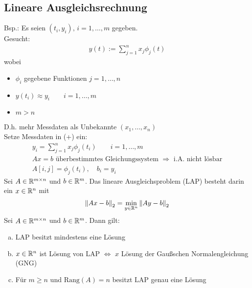 \subsection{Lineare Ausgleichsrechnung}
Bsp.: Es seien $(t_i, y_i),\,i=1,\ldots,m$ gegeben.\\
Gesucht: 
\begin{align*}
  y(t) := \sum^{n}_{j=1} x_j \phi_j(t) \tag{ + }
\end{align*}
wobei
\begin{itemize}
  \item $\phi_i$ gegebene Funktionen $j=1,\ldots,n$
  \item $y(t_i) \approx y_i \qquad i=1,\ldots,m$
  \item $m > n$
\end{itemize}
D.h. mehr Messdaten als Unbekannte $(x_1,\ldots,x_n)$\\
Setze Messdaten in (+) ein:
\begin{align*}
  y_i = \sum^{n}_{j=1} x_j \phi_j(t_i) \qquad i=1,\ldots,m\\
  Ax=b \text{ überbestimmtes Gleichungssystem } \Rightarrow \text{ i.A. nicht lösbar}\\
  A[i,j] = \phi_j(t_i), \quad b_i = y_i
\end{align*}
 Sei $A \in \mathbb{R}^{m \times n}$ und $b \in \mathbb{R}^{m}$. Das lineare Ausgleichsproblem (LAP) besteht darin ein $x \in \mathbb{R}^{n}$ mit
\begin{align*}
  \left\lVert Ax-b \right\rVert_2 = \underset{y \in \mathbb{R}^{n}}{\min} \left\lVert Ay - b \right\rVert_2
\end{align*}
\satz Sei $A \in \mathbb{R}^{m \times n}$ und $b \in \mathbb{R}^{m}$. Dann gilt:
\begin{enumerate}[a)]
  \item LAP besitzt mindestens eine Lösung
  \item $x \in \mathbb{R}^{n}$ ist Lösung von LAP $\Leftrightarrow$ $x$ Lösung der Gaußschen Normalengleichung (GNG)
  \item Für $m \geq n$ und $\mathrm{Rang}(A) = n$ besitzt LAP genau eine Lösung

\end{enumerate}
\beweis
